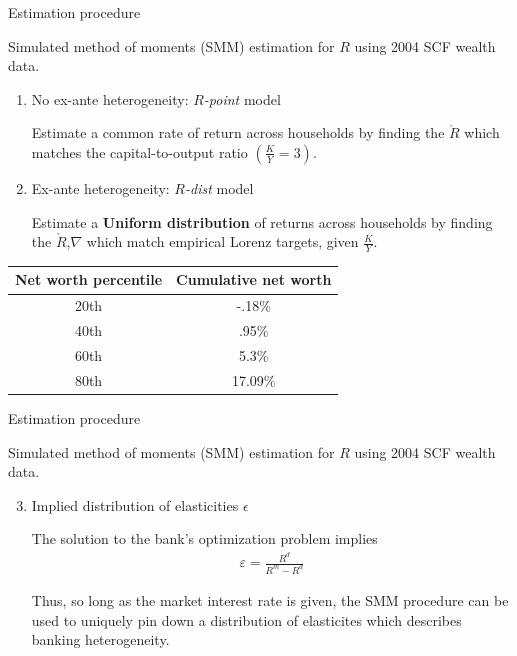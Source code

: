 \documentclass{beamer}
\begin{document}
\begin{frame}{Estimation procedure}


Simulated method of moments (SMM) estimation for $R$ using 2004 SCF wealth data.

  \begin{enumerate}
  \item No ex-ante heterogeneity: $R$\textit{-point} model
  \par Estimate a common rate of return across households by finding the $\grave{R}$ which matches the capital-to-output ratio $(\frac{K}{Y} = 3)$.
  \vspace{2.5mm}

  \item Ex-ante heterogeneity: $R$\textit{-dist} model
  \par Estimate  a \textbf{Uniform distribution} of returns across households by finding the $\grave{R}$,$\nabla$ which match empirical Lorenz targets, given $\frac{K}{Y}$.
  \end{enumerate}
  
  \centering
  \small
  \begin{tabular}{|c|c|}
\hline
Net worth percentile & Cumulative net worth \\
\hline
20th & -.18\%  \\
40th &  .95\% \\
60th &  5.3\% \\
80th &  17.09\% \\
\hline
\end{tabular}


\end{frame}

\begin{frame}{Estimation procedure}

Simulated method of moments (SMM) estimation for $R$ using 2004 SCF wealth data.

\begin{enumerate}
  \setcounter{enumi}{2} 
\item Implied distribution of elasticities $\epsilon$
  \par The solution to the bank's optimization problem implies
  \begin{align}
    \varepsilon = \frac{R^d}{R^m - R^d}
  \end{align}

  \par Thus, so long as the market interest rate is given, the SMM procedure can be used to uniquely pin down a distribution of elasticites which describes banking heterogeneity.
  \end{enumerate}

\end{frame}
\end{document}
